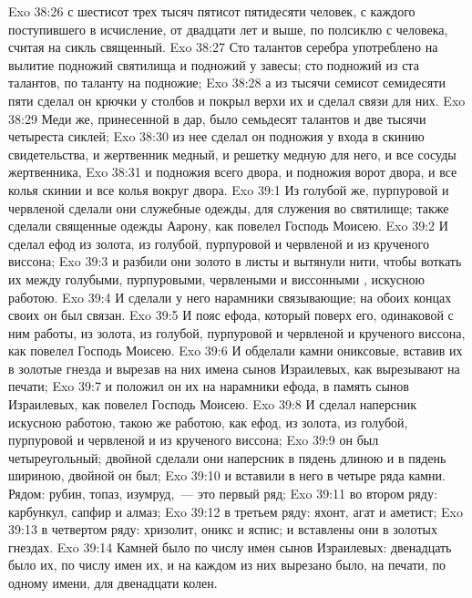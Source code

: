 \vs Exo 38:26 с шестисот трех тысяч пятисот пятидесяти человек, с каждого поступившего в исчисление, от двадцати лет и выше, по полсиклю с человека, считая на сикль священный.
\vs Exo 38:27 Сто талантов серебра употреблено на вылитие подножий святилища и подножий у завесы; сто подножий из ста талантов, по таланту на подножие;
\vs Exo 38:28 а из тысячи семисот семидесяти пяти  сделал он крючки у столбов и покрыл верхи их и сделал связи для них.
\vs Exo 38:29 Меди же, принесенной в дар, было семьдесят талантов и две тысячи четыреста сиклей;
\vs Exo 38:30 из нее сделал он подножия  у входа в скинию свидетельства, и жертвенник медный, и решетку медную для него, и все сосуды жертвенника,
\vs Exo 38:31 и подножия  всего двора, и подножия  ворот двора, и все колья скинии и все колья вокруг двора.
\vs Exo 39:1 Из голубой же, пурпуровой и червленой  сделали они служебные одежды, для служения во святилище; также сделали священные одежды Аарону, как повелел Господь Моисею.
\vs Exo 39:2 И сделал ефод из золота, из голубой, пурпуровой и червленой  и из крученого виссона;
\vs Exo 39:3 и разбили они золото в листы и вытянули нити, чтобы воткать их между голубыми, пурпуровыми, червлеными и виссонными , искусною работою.
\vs Exo 39:4 И сделали у него нарамники связывающие; на обоих концах своих он был связан.
\vs Exo 39:5 И пояс ефода, который поверх его, одинаковой с ним работы,  из золота, из голубой, пурпуровой и червленой  и крученого виссона, как повелел Господь Моисею.
\vs Exo 39:6 И обделали камни ониксовые, вставив их в золотые гнезда и вырезав на них имена сынов Израилевых, как вырезывают на печати;
\vs Exo 39:7 и положил он их на нарамники ефода, в память сынов Израилевых, как повелел Господь Моисею.
\rsbpar\vs Exo 39:8 И сделал наперсник искусною работою, такою же работою, как ефод, из золота, из голубой, пурпуровой и червленой  и из крученого виссона;
\vs Exo 39:9 он был четыреугольный; двойной сделали они наперсник в пядень длиною и в пядень шириною, двойной он был;
\vs Exo 39:10 и вставили в него в четыре ряда камни. Рядом: рубин, топаз, изумруд,~--- это первый ряд;
\vs Exo 39:11 во втором ряду: карбункул, сапфир и алмаз;
\vs Exo 39:12 в третьем ряду: яхонт, агат и аметист;
\vs Exo 39:13 в четвертом ряду: хризолит, оникс и яспис; и вставлены они в золотых гнездах.
\vs Exo 39:14 Камней было по числу имен сынов Израилевых: двенадцать было их, по числу имен их, и на каждом из них вырезано было,  на печати, по одному имени, для двенадцати колен.
